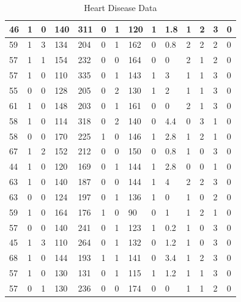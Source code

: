 \documentclass{article}
\begin{document}
\begin{table}[h!]
\begin{tabular}{|l|l|l|l|l|l|l|l|l|l|l|l|l|l|}
46 & 1 & 0 & 140 & 311 & 0 & 1 & 120 & 1 & 1.8 & 1  &2 & 3 & 0 \\ \hline
59 & 1 & 3 & 134 & 204 & 0 & 1 & 162 & 0 & 0.8 & 2  &2 & 2 & 0 \\ \hline
57 & 1 & 1 & 154 & 232 & 0 & 0 & 164 & 0 & 0 & 2  &1 & 2 & 0 \\ \hline
57 & 1 & 0 & 110 & 335 & 0 & 1 & 143 & 1 & 3 & 1  &1 & 3 & 0 \\ \hline
55 & 0 & 0 & 128 & 205 & 0 & 2 & 130 & 1 & 2 & 1  &1 & 3 & 0 \\ \hline
61 & 1 & 0 & 148 & 203 & 0 & 1 & 161 & 0 & 0 & 2  &1 & 3 & 0 \\ \hline
58 & 1 & 0 & 114 & 318 & 0 & 2 & 140 & 0 & 4.4 & 0  &3 & 1 & 0 \\ \hline
58 & 0 & 0 & 170 & 225 & 1 & 0 & 146 & 1 & 2.8 & 1  &2 & 1 & 0 \\ \hline
67 & 1 & 2 & 152 & 212 & 0 & 0 & 150 & 0 & 0.8 & 1  &0 & 3 & 0 \\ \hline
44 & 1 & 0 & 120 & 169 & 0 & 1 & 144 & 1 & 2.8 & 0  &0 & 1 & 0 \\ \hline
63 & 1 & 0 & 140 & 187 & 0 & 0 & 144 & 1 & 4 & 2  &2 & 3 & 0 \\ \hline
63 & 0 & 0 & 124 & 197 & 0 & 1 & 136 & 1 & 0 & 1  &0 & 2 & 0 \\ \hline
59 & 1 & 0 & 164 & 176 & 1 & 0 & 90 & 0 & 1 & 1  &2 & 1 & 0 \\ \hline
57 & 0 & 0 & 140 & 241 & 0 & 1 & 123 & 1 & 0.2 & 1  &0 & 3 & 0 \\ \hline
45 & 1 & 3 & 110 & 264 & 0 & 1 & 132 & 0 & 1.2 & 1  &0 & 3 & 0 \\ \hline
68 & 1 & 0 & 144 & 193 & 1 & 1 & 141 & 0 & 3.4 & 1  &2 & 3 & 0 \\ \hline
57 & 1 & 0 & 130 & 131 & 0 & 1 & 115 & 1 & 1.2 & 1  &1 & 3 & 0 \\ \hline
57 & 0 & 1 & 130 & 236 & 0 & 0 & 174 & 0 & 0 & 1  &1 & 2 & 0 \\ \hline
\end{tabular}
\caption{Heart Disease Data}
\end{table}
\end{document}

